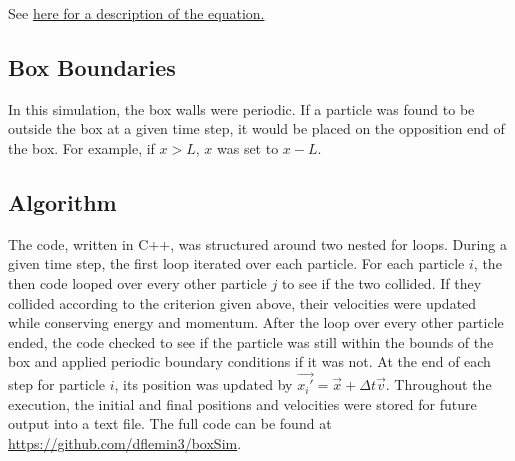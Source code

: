 \documentclass[12pt]{amsart}
\begin{document}
 See \href{https://en.wikipedia.org/wiki/Elastic_collision#Two-dimensional_collision_with_two_moving_objects}{here for a description of the equation.}

\subsection{Box Boundaries}

In this simulation, the box walls were periodic.  If a particle was found to be outside the box at a given time step, it would be placed on the opposition end of the box.  For example, if $x > L$, $x$ was set to $x - L$.

\subsection{Algorithm}

The code, written in C++, was structured around two nested for loops.  During a given time step, the first loop iterated over each particle.  For each particle $i$, the then code looped over every other particle $j$ to see if the two collided.  If they collided according to the criterion given above, their velocities were updated while conserving energy and momentum.  After the loop over every other particle ended, the code checked to see if the particle was still within the bounds of the box and applied periodic boundary conditions if it was not.  At the end of each step for particle $i$, its position was updated by $\vec{x_i'} = \vec{x} + \Delta t \vec{v}$.  Throughout the execution, the initial and final positions and velocities were stored for future output into a text file.  The full code can be found at \href{https://github.com/dflemin3/boxSim}{https://github.com/dflemin3/boxSim}.
\end{document}
